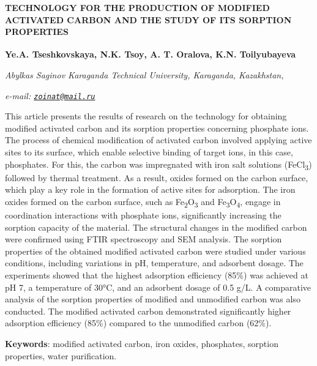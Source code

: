 \begin{articleheader}
{\bfseries TECHNOLOGY FOR THE PRODUCTION OF MODIFIED ACTIVATED CARBON AND THE STUDY OF ITS SORPTION PROPERTIES}

{\bfseries
Ye.A. Tseshkovskaya,
N.K. Tsoy\textsuperscript{\envelope },
A. T. Oralova,
K.N. Toilyubayeva}
\end{articleheader}

\begin{affiliation}
\emph{Abylkas Saginov Karaganda Technical University, Karaganda, Kazakhstan,}

\emph{e-mail: \href{mailto:zoinat@mail.ru}{\nolinkurl{zoinat@mail.ru}}}
\end{affiliation}

This article presents the results of research on the technology for
obtaining modified activated carbon and its sorption properties
concerning phosphate ions. The process of chemical modification of
activated carbon involved applying active sites to its surface, which
enable selective binding of target ions, in this case, phosphates. For
this, the carbon was impregnated with iron salt solutions
(FeCl\textsubscript{3}) followed by thermal treatment. As a result,
oxides formed on the carbon surface, which play a key role in the
formation of active sites for adsorption. The iron oxides formed on the
carbon surface, such as Fe\textsubscript{2}O\textsubscript{3} and
Fe\textsubscript{3}O\textsubscript{4}, engage in coordination
interactions with phosphate ions, significantly increasing the sorption
capacity of the material. The structural changes in the modified carbon
were confirmed using FTIR spectroscopy and SEM analysis. The sorption
properties of the obtained modified activated carbon were studied under
various conditions, including variations in pH, temperature, and
adsorbent dosage. The experiments showed that the highest adsorption
efficiency (85\%) was achieved at pH 7, a temperature of 30°C, and an
adsorbent dosage of 0.5 g/L. A comparative analysis of the sorption
properties of modified and unmodified carbon was also conducted. The
modified activated carbon demonstrated significantly higher adsorption
efficiency (85\%) compared to the unmodified carbon (62\%).

{\bfseries Keywords}: modified activated carbon, iron oxides, phosphates,
sorption properties, water purification.

